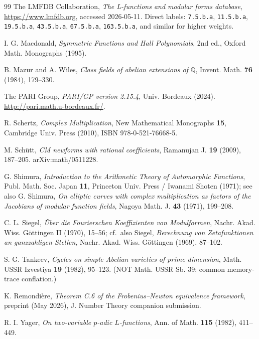 \documentclass[11pt,a4paper]{amsart}
\theoremstyle{definition}
\newcommand{\Q}{\mathbb{Q}}
\begin{document}
\begin{thebibliography}{99}
 The LMFDB Collaboration, \emph{The L-functions and modular forms database}, \url{https://www.lmfdb.org}, accessed 2026-05-11. Direct labels: \texttt{7.5.b.a}, \texttt{11.5.b.a}, \texttt{19.5.b.a}, \texttt{43.5.b.a}, \texttt{67.5.b.a}, \texttt{163.5.b.a}, and similar for higher weights.

 I. G. Macdonald, \emph{Symmetric Functions and Hall Polynomials}, 2nd ed., Oxford Math. Monographs (1995).

 B. Mazur and A. Wiles, \emph{Class fields of abelian extensions of $\Q$}, Invent. Math. \textbf{76} (1984), 179--330.

 The PARI Group, \emph{PARI/GP version 2.15.4}, Univ. Bordeaux (2024). \url{http://pari.math.u-bordeaux.fr/}.

 R. Schertz, \emph{Complex Multiplication}, New Mathematical Monographs \textbf{15}, Cambridge Univ. Press (2010), ISBN 978-0-521-76668-5.

 M. Sch\"utt, \emph{CM newforms with rational coefficients}, Ramanujan J. \textbf{19} (2009), 187--205. arXiv:math/0511228.

 G. Shimura, \emph{Introduction to the Arithmetic Theory of Automorphic Functions}, Publ. Math. Soc. Japan \textbf{11}, Princeton Univ. Press / Iwanami Shoten (1971); see also G. Shimura, \emph{On elliptic curves with complex multiplication as factors of the Jacobians of modular function fields}, Nagoya Math. J. \textbf{43} (1971), 199--208.

 C. L. Siegel, \emph{\"Uber die Fourierschen Koeffizienten von Modulformen}, Nachr. Akad. Wiss. G\"ottingen II (1970), 15--56; cf.\ also Siegel, \emph{Berechnung von Zetafunktionen an ganzzahligen Stellen}, Nachr. Akad. Wiss. G\"ottingen (1969), 87--102.

 S. G. Tankeev, \emph{Cycles on simple Abelian varieties of prime dimension}, Math. USSR Izvestiya \textbf{19} (1982), 95--123. (NOT Math. USSR Sb. 39; common memory-trace conflation.)

 K. Remondi\`ere, \emph{Theorem C.6 of the Frobenius--Newton equivalence framework}, preprint (May 2026), J. Number Theory companion submission.

 R. I. Yager, \emph{On two-variable $p$-adic $L$-functions}, Ann. of Math. \textbf{115} (1982), 411--449.

\end{thebibliography}
\end{document}
